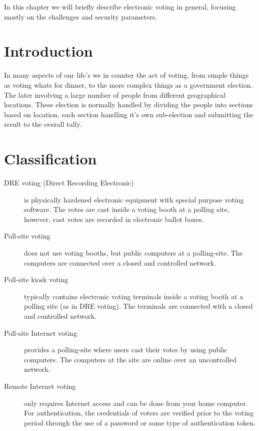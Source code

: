 In this chapter we will briefly describe electronic voting in general, focusing mostly on the challenges and security parameters.

\section{Introduction}
In many aspects of our life's we in counter the act of voting, from simple things as voting whats for dinner, to the more complex things as a government election. The later involving a large number of people from different geographical locations. These election is normally handled by dividing the people into sections based on location, each section handling it's own sub-election and submitting the result to the overall tally.


\section{Classification}

\begin{description}
    
\item[DRE voting (Direct Recording Electronic)] is physically hardened electronic
equipment with special purpose voting software. The votes are
cast inside a voting booth at a polling site, however, cast votes are
recorded in electronic ballot boxes.

\item[Poll-site voting] does not use voting booths, but public computers at a
polling-site. The computers are connected over a closed and controlled
network.

\item[Poll-site kiosk voting] typically contains electronic voting terminals inside
a voting booth at a polling site (as in DRE voting). The terminals
are connected with a closed and controlled network.

\item[Poll-site Internet voting] provides a polling-site where users cast their
votes by using public computers. The computers at the site are online
over an uncontrolled network.

\item[Remote Internet voting] only requires Internet access and can be done
from your home computer. For authentication, the credentials of voters
are verified prior to the voting period through the use of a password
or some type of authentication token.

\end{description}


